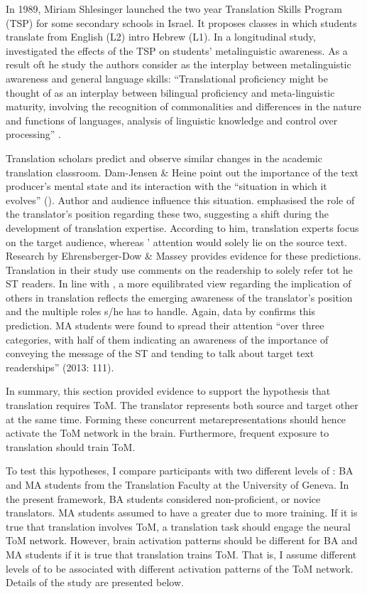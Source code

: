 \documentclass[output=paper]{LSP/langsci}
\begin{document}
In 1989, Miriam Shlesinger launched the two year Translation Skills Program (TSP) for some secondary schools in Israel. It proposes classes in which students translate from English (L2) intro Hebrew (L1). In a longitudinal study, \citet{Shlesinger2011} investigated the effects of the TSP on students' metalinguistic awareness. As a result oft he study the authors consider  as the interplay between metalinguistic awareness and general language skills: ``Translational proficiency might be thought of as an interplay between bilingual proficiency and meta-linguistic maturity, involving the recognition of commonalities and differences in the nature and functions of languages, analysis of linguistic knowledge and control over processing'' \citep[164]{Shlesinger2011}.

Translation scholars predict and observe similar changes in the academic translation classroom. Dam-Jensen \& Heine point out the importance of the text producer's mental state and its interaction with the ``situation in which it evolves'' (\citeyear[91]{DamJensen2013}). Author and audience influence this situation. \citet{Shreve2009} emphasised the role of the translator's position regarding these two, suggesting a shift during the development of translation expertise. According to him, translation experts focus on the target audience, whereas ' attention would solely lie on the source text. Research by Ehrensberger-Dow \& Massey provides evidence for these predictions. Translation  in their study use comments on the readership to solely refer tot he ST readers. In line with \citet{Shreve2009}, a more equilibrated view regarding the implication of others in translation reflects the emerging awareness of the translator's position and the multiple roles s/he has to handle. Again, data by \citet{EhrensbergerDow2013} confirms this prediction. MA students were found to spread their attention ``over three categories, with half of them indicating an awareness of the importance of conveying the message of the ST and tending to talk about target text readerships'' (2013: 111). 

In summary, this section provided evidence to support the hypothesis that translation requires ToM. The translator represents both source and target other at the same time. Forming these concurrent metarepresentations should hence activate the ToM network in the brain. Furthermore, frequent exposure to translation should train ToM.

To test this hypotheses, I compare participants with two different levels of : BA and MA students from the Translation Faculty at the University of Geneva. In the present framework,  BA students considered non-proficient, or novice translators. MA students assumed to have a greater  due to more training. If it is true that translation involves ToM, a translation task should engage the neural ToM network. However, brain activation patterns should be different for BA and MA students if it is true that translation trains ToM. That is, I assume different levels of  to be associated with different activation patterns of the ToM network. Details of the study are presented below.
\end{document}
